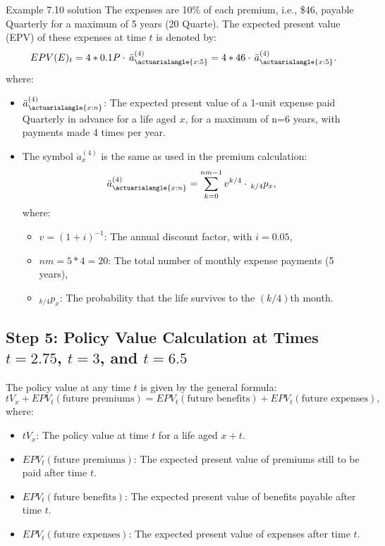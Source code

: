 \begin{solve}{}{Example 7.10 solution}
		The expenses are 10\% of each premium, i.e., \$46, payable Quarterly for a maximum of 5 years (20 Quarte). The expected present value (EPV) of these expenses at time \(t\) is denoted by:
		\[
		EPV(E)_t = 4 * 0.1P \cdot \, \ddot{a}_{\actuarialangle{x:5}}^{(4)} = 4 * 46 \cdot \, \ddot{a}_{\actuarialangle{x:5}}^{(4)}.
		\]
		where:
		\begin{itemize}
			\item \(\ddot{a}_{\actuarialangle{x:n}}^{(4)}\): The expected present value of a 1-unit expense paid Quarterly in advance for a life aged \(x\), for a maximum of n=6 years, with payments made 4 times per year.
			\item The symbol \(\ddot{a}_{x}^{(4)}\) is the same as used in the premium calculation:
			\[
			\ddot{a}_{\actuarialangle{x:n}}^{(4)} = \sum_{k=0}^{nm-1} v^{k/4} \cdot \, _{k/4}p_x,
			\]
			where:
			\begin{itemize}
				\item \(v = (1+i)^{-1}\): The annual discount factor, with \(i = 0.05\),
				\item \(nm = 5*4 = 20\): The total number of monthly expense payments (5 years),
				\item \(_{k/4}p_x\): The probability that the life survives to the \((k/4)\)th month.
			\end{itemize}
		\end{itemize}
		
		
		\subsection*{Step 5: Policy Value Calculation at Times \(t = 2.75\), \(t = 3\), and \(t = 6.5\)}
		
		The policy value at any time \(t\) is given by the general formula:
		\[
		tV_x + EPV_t(\text{future premiums}) = EPV_t(\text{future benefits}) + EPV_t(\text{future expenses}),
		\]
		where:
		\begin{itemize}
			\item \(tV_x\): The policy value at time \(t\) for a life aged \(x+t\).
			\item \(EPV_t(\text{future premiums})\): The expected present value of premiums still to be paid after time \(t\).
			\item \(EPV_t(\text{future benefits})\): The expected present value of benefits payable after time \(t\).
			\item \(EPV_t(\text{future expenses})\): The expected present value of expenses after time \(t\).
		\end{itemize}
		

\end{solve}
